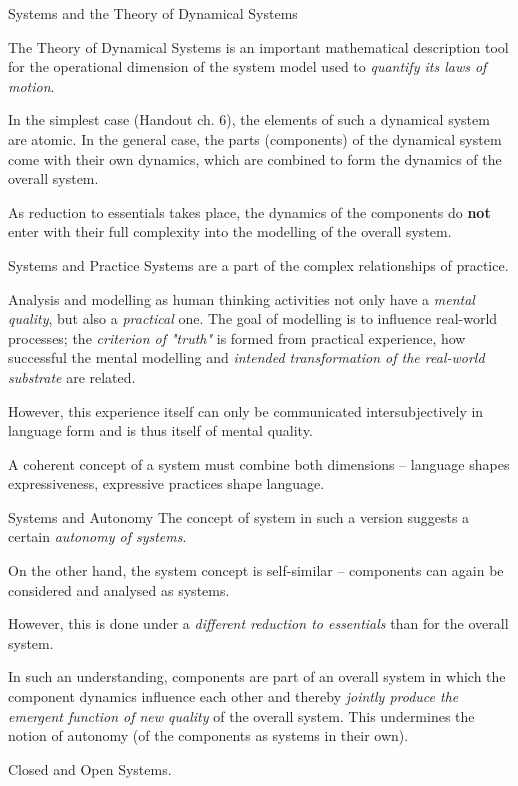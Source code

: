 \documentclass{beamer}
\begin{document}
\begin{frame}{Systems and the Theory of Dynamical Systems}

  The Theory of Dynamical Systems is an important mathematical description
  tool for the operational dimension of the system model used to
  \emph{quantify its laws of motion}.

  In the simplest case (Handout ch. 6), the elements of such a dynamical
  system are atomic. In the general case, the parts (components) of the
  dynamical system come with their own dynamics, which are combined to form
  the dynamics of the overall system.

  As reduction to essentials takes place, the dynamics of the components do
  \textbf{not} enter with their full complexity into the modelling of the
  overall system.
\end{frame}

\begin{frame}{Systems and Practice}
Systems are a part of the complex relationships of practice.

Analysis and modelling as human thinking activities not only have a
\emph{mental quality}, but also a \emph{practical} one. The goal of modelling
is to influence real-world processes; the \emph{criterion of "truth"} is
formed from practical experience, how successful the mental modelling and
\emph{intended transformation of the real-world substrate} are related.

However, this experience itself can only be communicated intersubjectively in
language form and is thus itself of mental quality.

A coherent concept of a system must combine both dimensions -- language shapes
expressiveness,  expressive practices shape language.
\end{frame}

\begin{frame}{Systems and Autonomy}
The concept of system in such a version suggests a certain \emph{autonomy of
  systems}.

On the other hand, the system concept is self-similar -- components can again
be considered and analysed as systems.

However, this is done under a \emph{different reduction to essentials} than
for the overall system.

In such an understanding, components are part of an overall system in which
the component dynamics influence each other and thereby \emph{jointly produce
  the emergent function of new quality} of the overall system. This undermines
the notion of autonomy (of the components as systems in their own).

Closed and Open Systems.   
\end{frame}
\end{document}
